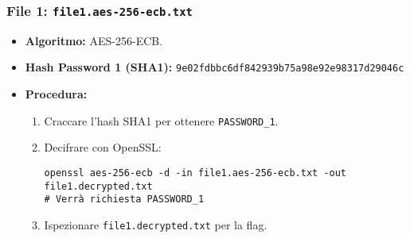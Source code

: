 \subsubsection{File 1: \texttt{file1.aes-256-ecb.txt}}
\begin{itemize}
    \item \textbf{Algoritmo:} AES-256-ECB.
    \item \textbf{Hash Password 1 (SHA1):} \texttt{9e02fdbbc6df842939b75a98e92e98317d29046c}
    \item \textbf{Procedura:}
    \begin{enumerate}
        \item Craccare l'hash SHA1 per ottenere \texttt{PASSWORD\_1}.
        \item Decifrare con OpenSSL:
        \begin{verbatim}
openssl aes-256-ecb -d -in file1.aes-256-ecb.txt -out file1.decrypted.txt
# Verrà richiesta PASSWORD_1
        \end{verbatim}
        \item Ispezionare \texttt{file1.decrypted.txt} per la flag.
    \end{enumerate}
\end{itemize}

